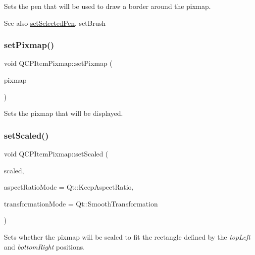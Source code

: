 Sets the pen that will be used to draw a border around the pixmap.

\begin{DoxySeeAlso}{See also}
\mbox{\hyperlink{class_q_c_p_item_pixmap_afc5e479e88e53740176ce77cb70dd67a}{set\+Selected\+Pen}}, set\+Brush 
\end{DoxySeeAlso}
\mbox{\label{class_q_c_p_item_pixmap_a726b69ea4025edf48f9b29b6450548a7}} 
\subsubsection{\texorpdfstring{setPixmap()}{setPixmap()}}
{\footnotesize\ttfamily void Q\+C\+P\+Item\+Pixmap\+::set\+Pixmap (\begin{DoxyParamCaption}\item[{const Q\+Pixmap \&}]{pixmap }\end{DoxyParamCaption})}

Sets the pixmap that will be displayed. \mbox{\label{class_q_c_p_item_pixmap_ab4d44529a1c6c8d37d0ea7560e042777}} 
\subsubsection{\texorpdfstring{setScaled()}{setScaled()}}
{\footnotesize\ttfamily void Q\+C\+P\+Item\+Pixmap\+::set\+Scaled (\begin{DoxyParamCaption}\item[{bool}]{scaled,  }\item[{Qt\+::\+Aspect\+Ratio\+Mode}]{aspect\+Ratio\+Mode = {\ttfamily Qt\+:\+:KeepAspectRatio},  }\item[{Qt\+::\+Transformation\+Mode}]{transformation\+Mode = {\ttfamily Qt\+:\+:SmoothTransformation} }\end{DoxyParamCaption})}

Sets whether the pixmap will be scaled to fit the rectangle defined by the {\itshape top\+Left} and {\itshape bottom\+Right} positions. \mbox{\label{class_q_c_p_item_pixmap_afc5e479e88e53740176ce77cb70dd67a}} 
